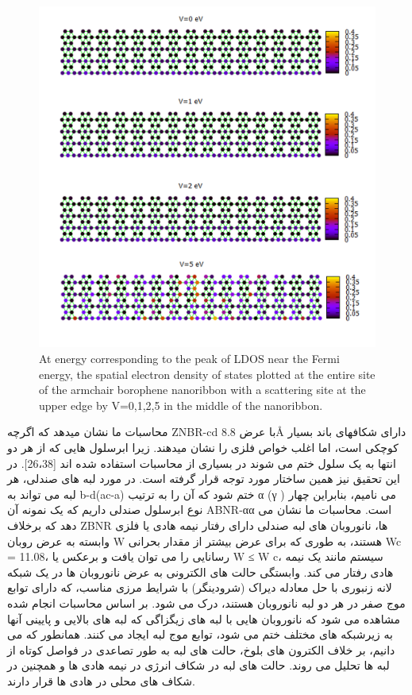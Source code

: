 \begin{figure}[!ht]
    \centering
    \includegraphics[width=1\linewidth]{./figures/Slide3.PNG}
    \caption{At energy corresponding to the peak of LDOS near the Fermi energy, the spatial electron density of states plotted at the entire site of the armchair borophene nanoribbon 
    with a scattering site at the upper edge by V=0,1,2,5 in the middle of the nanoribbon.}
    \label{armCSLDOS}
  \end{figure}
محاسبات ما نشان میدهد که اگرچه ZNBR-cd با عرض 8.8Å دارای شکافهای باند بسیار کوچکی است، اما اغلب خواص فلزی را نشان میدهند. زیرا ابرسلول هایی که از هر دو انتها به یک سلول ختم می شوند در بسیاری از محاسبات استفاده شده اند [26،38]. در این تحقیق نیز همین ساختار مورد توجه قرار گرفته است. در مورد لبه های صندلی، هر لبه می تواند به b-d(ac-a) ختم شود که آن را به ترتیب α (γ ) می نامیم، بنابراین چهار نوع ابرسلول صندلی داریم که یک نمونه آن ABNR-αα است. محاسبات ما نشان می دهد که برخلاف ZBNR ها، نانوروبان های لبه صندلی دارای رفتار نیمه هادی یا فلزی وابسته به عرض روبان W هستند، به طوری که برای عرض بیشتر از مقدار بحرانی Wc = 11.08، رسانایی را می توان یافت و برعکس یا W ≤ W c، سیستم مانند یک نیمه هادی رفتار می کند. وابستگی حالت های الکترونی به عرض نانوروبان ها در یک شبکه لانه زنبوری با حل معادله دیراک (شرودینگر) با شرایط مرزی مناسب، که دارای توابع موج صفر در هر دو لبه نانوروبان هستند، درک می شود. بر اساس محاسبات انجام شده مشاهده می شود که نانوروبان هایی با لبه های زیگزاگی که لبه های بالایی و پایینی آنها به زیرشبکه های مختلف ختم می شود، توابع موج لبه ایجاد می کنند. همانطور که می دانیم، بر خلاف الکترون های بلوخ، حالت های لبه به طور تصاعدی در فواصل کوتاه از لبه ها تحلیل می روند. حالت های لبه در شکاف انرژی در نیمه هادی ها و همچنین در شکاف های محلی در هادی ها قرار دارند.

